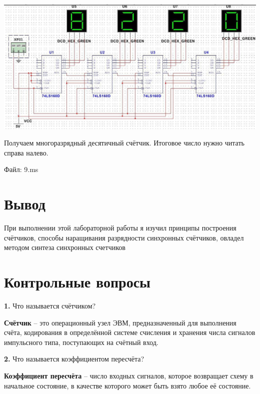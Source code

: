 \documentclass[a4paper,12pt]{article}
\begin{document}
\begin{center}
	\includegraphics[scale=0.6]{../screens/7.jpg}
\end{center}


\noindent Получаем многоразрядный десятичный счётчик. Итоговое число нужно читать справа налево.\newline

\noindent Файл: 9.ms

\section{Вывод}

\noindent При выполнении этой лабораторной работы я изучил принципы построения счётчиков, способы наращивания разрядности синхронных счётчиков, овладел методом синтеза синхронных счетчиков

\section{Контрольные вопросы}

\noindent\textbf{1.} Что называется счётчиком?\newline

\noindent\textbf{Счётчик} -- это операционный узел ЭВМ, предназначенный для выполнения счёта, кодирования в определённой системе счисления и хранения числа сигналов импульсного типа, поступающих на счётный вход.
\newline

\clearpage
\noindent\textbf{2.} Что называется коэффициентом пересчёта? \newline

\noindent\textbf{Коэффициент пересчёта} -- число входных сигналов, которое возвращает схему в начальное состояние, в качестве которого может быть взято любое её состояние.
\newline
\end{document}
